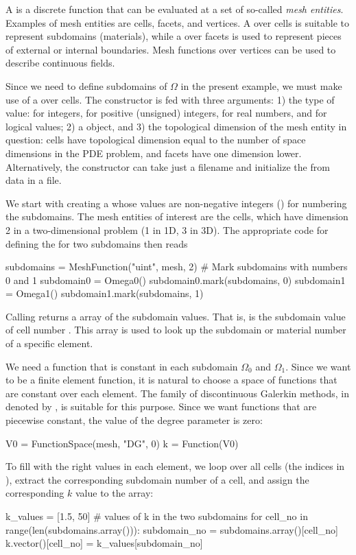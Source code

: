 A  is a discrete function that can be evaluated at a
set of so-called \emph{mesh entities}. Examples of mesh entities are cells,
facets, and vertices. A  over cells is suitable
to represent subdomains (materials), while a  over
facets is used to represent pieces of external or internal boundaries.
Mesh functions over vertices can be used to describe continuous fields.

Since we need to define subdomains of $\Omega$ in the present example, we
must make use of a  over cells. The 
constructor is fed with three arguments: 1) the type of value:
 for integers,  for positive (unsigned) integers,
 for real numbers, and  for logical values; 2)
a  object, and 3) the topological dimension of the mesh entity
in question: cells have topological dimension equal to the number of
space dimensions in the PDE problem, and facets have one dimension lower.
Alternatively, the constructor can take just a filename and initialize
the  from data in a file.

We start with creating a  whose values are non-negative
integers () for numbering the subdomains.  The mesh entities
of interest are the cells, which have dimension 2 in a two-dimensional
problem (1 in 1D, 3 in 3D). The appropriate code for defining the
 for two subdomains then reads
\begin{python}
subdomains = MeshFunction("uint", mesh, 2)
# Mark subdomains with numbers 0 and 1
subdomain0 = Omega0()
subdomain0.mark(subdomains, 0)
subdomain1 = Omega1()
subdomain1.mark(subdomains, 1)
\end{python}

Calling  returns a  array of the
subdomain values. That is,\break {} is the subdomain
value of cell number . This array is used to look up the subdomain
or material number of a specific element.

We need a function  that is constant in each subdomain $\Omega_0$
and $\Omega_1$. Since we want  to be a finite element function,
it is natural to choose a space of functions that are constant over each
element.  The family of discontinuous Galerkin methods, in \fenics{}
denoted by , is suitable for this purpose. Since we want
functions that are piecewise constant, the value of the degree parameter
is zero:
\begin{python}
V0 = FunctionSpace(mesh, "DG", 0)
k  = Function(V0)
\end{python}
To fill  with the right values in each element, we loop over all
cells (the indices in ), extract the corresponding
subdomain number of a cell, and assign the corresponding $k$ value to
the  array:
\begin{python}
k_values = [1.5, 50]  # values of k in the two subdomains
for cell_no in range(len(subdomains.array())):
    subdomain_no = subdomains.array()[cell_no]
    k.vector()[cell_no] = k_values[subdomain_no]
\end{python}

